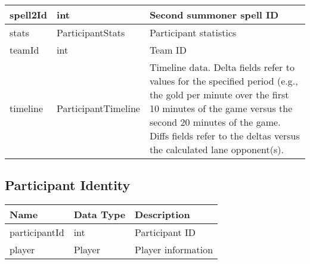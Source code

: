 \begin{table}[!h]
\begin{tabular}{llp{5cm}}
spell2Id                  & int                 & Second summoner spell ID                                                                                                                                                                                                                                 \\ \hline
stats                     & ParticipantStats    & Participant statistics                                                                                                                                                                                                                                   \\ \hline
teamId                    & int                 & Team ID                                                                                                                                                                                                                                                  \\ \hline
timeline                  & ParticipantTimeline & Timeline data. Delta fields refer to values for the specified period (e.g., the gold per minute over the first 10 minutes of the game versus the second 20 minutes of the game. Diffs fields refer to the deltas versus the calculated lane opponent(s). \\ \hline
\end{tabular}
\end{table}

\FloatBarrier
\subsection{Participant Identity}
\begin{table}[!h]
\footnotesize
\centering
\begin{tabular}{llp{5cm}}
\textbf{Name} & \textbf{Data Type} & \textbf{Description} \\ \hline
participantId & int & Participant ID \\ \hline
player & Player & Player information \\ \hline
\end{tabular}
\end{table}

\FloatBarrier
